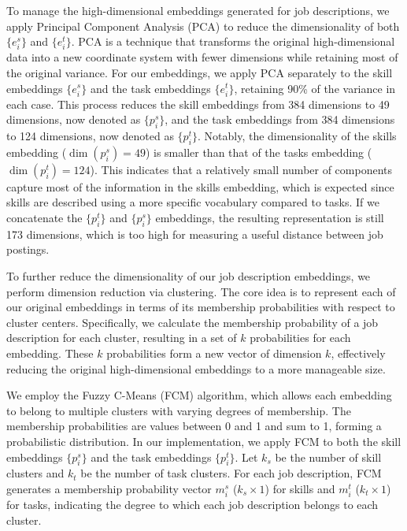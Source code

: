 To manage the high-dimensional embeddings generated for job descriptions, we apply Principal Component Analysis (PCA) 
to reduce the dimensionality of both \(\{e_i^s\}\) and \(\{e_i^t\}\). PCA is a technique that transforms the original 
high-dimensional data into a new coordinate system with fewer dimensions while retaining most of the original variance. 
For our embeddings, we apply PCA separately to the skill embeddings \(\{e_i^s\}\) and the task embeddings \(\{e_i^t\}\), 
retaining 90\% of the variance in each case. This process reduces the skill embeddings from 384 dimensions to 49 dimensions, 
now denoted as \(\{p_i^s\}\), and the task embeddings from 384 dimensions to 124 dimensions, now denoted as \(\{p_i^t\}\).
 Notably, the dimensionality of the skills embedding (\(\dim(p_i^s) = 49\)) is smaller than that of the tasks 
 embedding (\(\dim(p_i^t) = 124\)). This indicates that a relatively small number of components capture most of 
 the information in the skills embedding, which is expected since skills are described using a more specific vocabulary 
 compared to tasks. If we concatenate the \(\{p_i^t\}\) and \(\{p_i^s\}\) embeddings, the resulting representation is 
 still 173 dimensions, which is too high for measuring a useful distance between job postings.


To further reduce the dimensionality of our job description embeddings, we perform dimension reduction via clustering. 
The core idea is to represent each of our original embeddings in terms of its membership probabilities with respect to 
cluster centers. Specifically, we calculate the membership probability of a job description for each cluster, resulting 
in a set of \(k\) probabilities for each embedding. These \(k\) probabilities form a new vector of dimension \(k\), 
effectively reducing the original high-dimensional embeddings to a more manageable size.

We employ the Fuzzy C-Means (FCM) algorithm, which allows each embedding to belong to multiple clusters with varying 
degrees of membership. The membership probabilities are values between 0 and 1 and sum to 1, forming a probabilistic 
distribution. In our implementation, we apply FCM to both the skill embeddings \(\{p_i^s\}\) and the task embeddings 
\(\{p_i^t\}\). Let \(k_s\) be the number of skill clusters and \(k_t\) be the number of task clusters. For each job 
description, FCM generates a membership probability vector \(m_i^s\) (\(k_s \times 1\)) for skills 
and \(m_i^t\) (\(k_t \times 1\)) for tasks, indicating the degree to which each job description belongs to each cluster.

